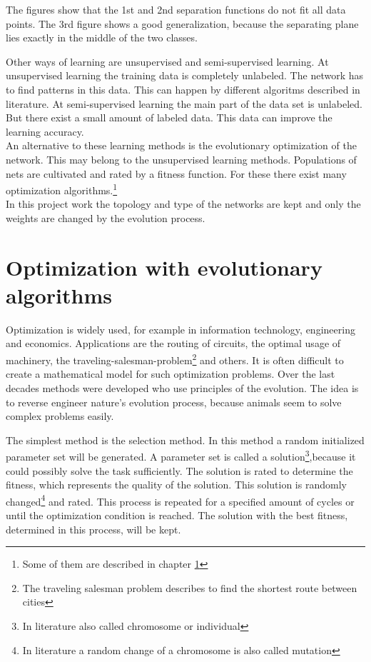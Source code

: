\documentclass[10pt,a4paper,DIV=11]{scrreprt}
\begin{document}
The figures show that the 1st and 2nd separation functions do not fit all data points. The 3rd figure shows a good generalization, because the separating plane lies exactly in the middle of the two classes.

Other ways of learning are unsupervised and semi-supervised learning. At unsupervised learning the training data is completely unlabeled. The network has to find patterns in this data. This can happen by different algoritms described in literature. At semi-supervised learning the main part of the data set is unlabeled. But there exist a small amount of labeled data. This data can improve the learning accuracy. \\

An alternative to these learning methods is the evolutionary optimization of the network. This may belong to the unsupervised learning methods. Populations of nets are cultivated and rated by a fitness function. For these there exist many optimization algorithms.\footnote{Some of them are described in chapter \ref{sec:evo}} \\

In this project work the topology and type of the networks are kept and only the weights are changed by the evolution process.




\chapter{Optimization with evolutionary algorithms}
\label{sec:evo}
Optimization is widely used, for example in information technology, engineering and
economics. Applications are the routing of circuits, the optimal usage of machinery,
the traveling-salesman-problem\footnote{The traveling salesman problem describes to find the shortest route between cities} and others. It is often difficult to create a mathematical
model for such optimization problems. Over the last decades methods were developed who use principles of the evolution. The idea is to reverse engineer nature's evolution process, because animals seem to solve complex problems easily.

The simplest method is the selection method. In this method a random initialized parameter set will be generated. A parameter set is called a solution\footnote{In literature also called chromosome or individual},because it could possibly solve the task sufficiently.
The solution is rated to determine the fitness, which represents the quality of the solution.
This solution is randomly changed\footnote{In literature a random change of a chromosome is also called mutation} and rated. This process is repeated for a specified amount of cycles or until the optimization condition is reached. The solution with the best fitness, determined in this process, will be kept.
\end{document}

